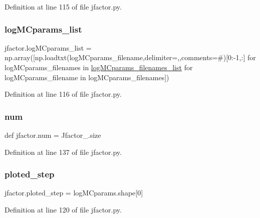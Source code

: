 Definition at line 115 of file jfactor.\+py.

\mbox{\label{namespacejfactor_a025ed272933b6b6f31f688649810e704}} 
\subsubsection{\texorpdfstring{log\+M\+Cparams\+\_\+list}{logMCparams\_list}}
{\footnotesize\ttfamily jfactor.\+log\+M\+Cparams\+\_\+list = np.\+array(\mbox{[}np.\+loadtxt(log\+M\+Cparams\+\_\+filename,delimiter=\textquotesingle{},\textquotesingle{},comments=\textquotesingle{}\#\textquotesingle{})\mbox{[}0\+:-\/1,\+:\mbox{]} for log\+M\+Cparams\+\_\+filenames in \hyperlink{namespacejfactor_a32ed195f2e906262c560b25bbc440b00}{log\+M\+Cparams\+\_\+filenames\+\_\+list} for log\+M\+Cparams\+\_\+filename in log\+M\+Cparams\+\_\+filenames\mbox{]})}



Definition at line 116 of file jfactor.\+py.

\mbox{\label{namespacejfactor_a4345d50706cf418a1957595314a7af18}} 
\subsubsection{\texorpdfstring{num}{num}}
{\footnotesize\ttfamily def jfactor.\+num = Jfactor\+\_\+.\+size}



Definition at line 137 of file jfactor.\+py.

\mbox{\label{namespacejfactor_a979d9034e576ba9891d6a8eb13f2a8b9}} 
\subsubsection{\texorpdfstring{ploted\+\_\+step}{ploted\_step}}
{\footnotesize\ttfamily jfactor.\+ploted\+\_\+step = log\+M\+Cparams.\+shape\mbox{[}0\mbox{]}}



Definition at line 120 of file jfactor.\+py.

